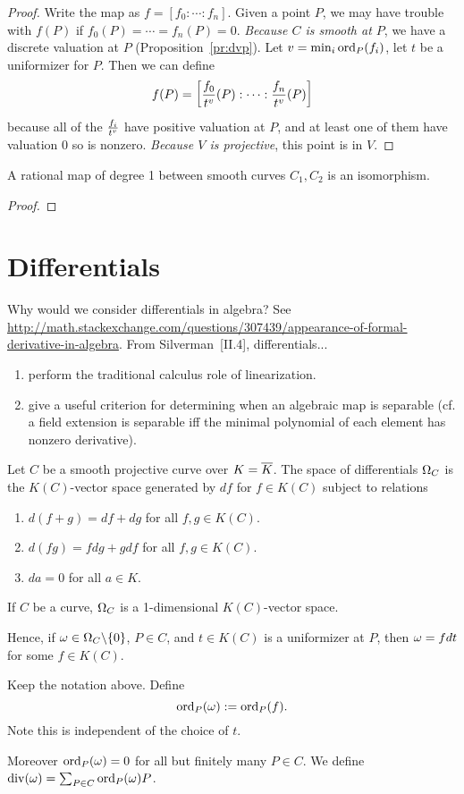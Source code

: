 \begin{proof}
Write the map as $f=[f_0:\cdots :f_n]$. Given a point $P$, we may have trouble with $f(P)$ if $f_0(P)=\cdots =f_n(P)=0$. 
{\it Because $C$ is smooth at $P$}, we have a discrete valuation at $P$ (Proposition~\ref{pr:dvp}).
Let $v=\min_i\operatorname{ord}_P(f_i)$, let $t$ be a uniformizer for $P$. Then we can define
\[
f(P)=\left[ {
\frac{f_0}{t^v}(P):\cdots :\frac{f_n}{t^v}(P)
} \right]
\]
because all of the $\frac{f_i}{t^v}$ have positive valuation at $P$, and at least one of them have valuation 0 so is nonzero.
{\it Because $V$ is projective}, this point is in $V$.
\end{proof}
\begin{pr}
A rational map of degree 1 between smooth curves $C_1,C_2$ is an isomorphism.
\end{pr}
\begin{proof}
\end{proof}

\section{Differentials}

Why would we consider differentials in algebra? See \url{http://math.stackexchange.com/questions/307439/appearance-of-formal-derivative-in-algebra}.
From Silverman~\cite{Si86}[II.4], differentials...
\begin{enumerate}
\item
perform the traditional calculus role of linearization.
\item
give a useful criterion for determining when an algebraic map is separable (cf. a field extension is separable iff the minimal polynomial of each element has nonzero derivative).
\end{enumerate}


Let $C$ be a smooth projective curve over $K=\overline{K}$. The space of differentials $\Omega_C$ is the $K(C)$-vector space generated by $df$ for $f\in K(C)$ subject to relations
\begin{enumerate}
\item
$d(f+g)=df+dg$ for all $f,g\in K(C)$.
\item
$d(fg)=fdg+gdf$  for all $f,g\in K(C)$.
\item
$da=0$ for all $a\in K$.
\end{enumerate} 
\begin{pr}
If $C$ be a curve,
$\Omega_C$ is a 1-dimensional $K(C)$-vector space. 

Hence, if $\omega\in \Omega_C\backslash\{0\}$, $P\in C$, and $t\in K(C)$ is a uniformizer at $P$, then $\omega =fdt$ for some $f\in K(C)$.
\end{pr}
\begin{df}
Keep the notation above. 
Define \[\operatorname{ord}_P(\omega):=\operatorname{ord}_P(f).\] 
Note this is independent of the choice of $t$.

Moreover $\operatorname{ord}_P(\omega)=0$ for all but finitely many $P\in C$. We define $\operatorname{div}(\omega)=\sum_{P\in C}\operatorname{ord}_P(\omega)P$. 
\end{df}

